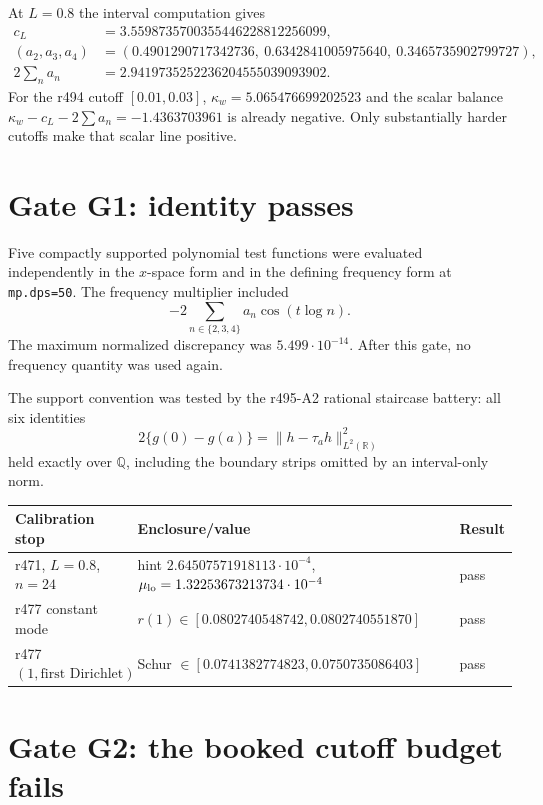 \documentclass[11pt]{article}
\begin{document}
At $L=0.8$ the interval computation gives
\begin{align*}
 c_L&=3.5598735700355446228812256099,\\
 (a_2,a_3,a_4)
  &=(0.4901290717342736,\ 0.6342841005975640,\
     0.3465735902799727),\\
 2\sum_n a_n&=2.9419735252236204555039093902.
\end{align*}
For the r494 cutoff $[0.01,0.03]$,
$\kappa_w=5.065476699202523$ and the scalar balance
$\kappa_w-c_L-2\sum a_n=-1.4363703961$ is already negative.
Only substantially harder cutoffs make that scalar line positive.

\section{Gate G1: identity passes}

Five compactly supported polynomial test functions were evaluated
independently in the $x$-space form and in the defining frequency
form at \texttt{mp.dps=50}.  The frequency multiplier included
\[
 -2\sum_{n\in\{2,3,4\}}a_n\cos(t\log n).
\]
The maximum normalized discrepancy was $5.499\cdot10^{-14}$.
After this gate, no frequency quantity was used again.

The support convention was tested by the r495-A2 rational staircase
battery: all six identities
\[
 2\{g(0)-g(a)\}=\|h-\tau_a h\|_{L^2(\mathbb R)}^2
\]
held exactly over $\mathbb Q$, including the boundary strips omitted
by an interval-only norm.

\begin{center}
\small
\begin{tabular}{@{}lll@{}}
\toprule
Calibration stop & Enclosure/value & Result\\
\midrule
r471, $L=0.8$, $n=24$
 & hint $2.64507571918113\cdot10^{-4}$,
   $\mu_{\rm lo}=1.32253673213734\cdot10^{-4}$ & pass\\
r477 constant mode
 & $r(1)\in[0.0802740548742,0.0802740551870]$ & pass\\
r477 $(1,\text{first Dirichlet})$
 & Schur $\in[0.0741382774823,0.0750735086403]$ & pass\\
\bottomrule
\end{tabular}
\end{center}

\section{Gate G2: the booked cutoff budget fails}
\end{document}

